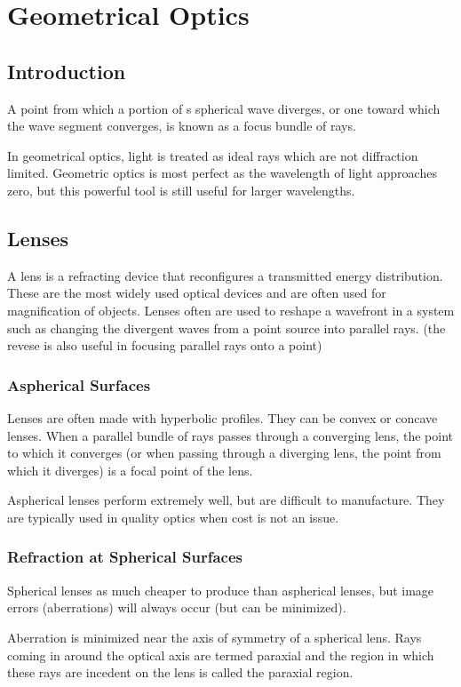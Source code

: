 \documentclass[12pt]{report}
\begin{document}
\chapter{Geometrical Optics}

\section{Introduction}
A point from which a portion of s spherical wave diverges, or one toward which the wave segment converges, is known as a focus bundle of rays. 

In geometrical optics, light is treated as ideal rays which are not diffraction limited. Geometric optics is most perfect as the wavelength of light approaches zero, but this powerful tool is still useful for larger wavelengths. 

\section{Lenses}
A lens is a refracting device that reconfigures a transmitted energy distribution. These are the most widely used optical devices and are often used for magnification of objects. Lenses often are used to reshape a wavefront in a system such as changing the divergent waves from a point source into parallel rays. (the revese is also useful in focusing parallel rays onto a point)

\subsection{Aspherical Surfaces}
Lenses are often made with hyperbolic profiles. They can be convex or concave lenses. When a parallel bundle of rays passes through a converging lens, the point to which it converges (or when passing through a diverging lens, the point from which it diverges) is a focal point of the lens. 

Aspherical lenses perform extremely well, but are difficult to manufacture. They are typically used in quality optics when cost is not an issue. 

\subsection{Refraction at Spherical Surfaces}
Spherical lenses as much cheaper to produce than aspherical lenses, but image errors (aberrations) will always occur (but can be minimized).

Aberration is minimized near the axis of symmetry of a spherical lens. Rays coming in around the optical axis are termed paraxial and the region in which these rays are incedent on the lens is called the paraxial region. 
\end{document}
